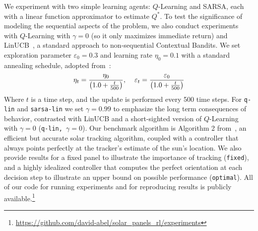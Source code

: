 \documentclass{article}
\begin{document}
We experiment with two simple learning agents: $Q$-Learning and SARSA, each with a linear function approximator to estimate $Q^*$. To test the significance of modeling the sequential aspects of the problem, we also conduct experiments with $Q$-Learning with $\gamma=0$ (so it only maximizes immediate return) and LinUCB~\cite{li2010contextual}, a standard approach to non-sequential Contextual Bandits. We set exploration parameter $\varepsilon_0=0.3$ and learning rate $\eta_0 = 0.1$ with a standard annealing schedule, adopted from~\citet{darken1990note}:
\begin{align*}
\eta_t = \frac{\eta_0}{\left(1.0 + \frac{t}{500}\right)}, \hspace{4mm} \varepsilon_t = \frac{\varepsilon_0}{\left(1.0 + \frac{t}{500}\right)}
\end{align*}
Where $t$ is a time step, and the update is performed every 500 time steps. For  \texttt{q-lin} and \texttt{sarsa-lin} we set $\gamma=0.99$ to emphasize the long term consequences of behavior, contrasted with LinUCB and a short-sighted version of $Q$-Learning with $\gamma = 0$ (\texttt{q-lin, $\gamma = 0$}). Our benchmark algorithm is Algorithm 2 from~\citet{Grena2012}, an efficient but accurate solar tracking algorithm, coupled with a controller that always points perfectly at the tracker's estimate of the sun's location. We also provide results for a fixed panel to illustrate the importance of tracking (\texttt{fixed}), and a highly idealized controller that computes the perfect orientation at each decision step to illustrate an upper bound on possible performance (\texttt{optimal}). All of our code for running experiments and for reproducing results is publicly available.\footnote{\url{https://github.com/david-abel/solar_panels_rl/experiments}}
\end{document}
